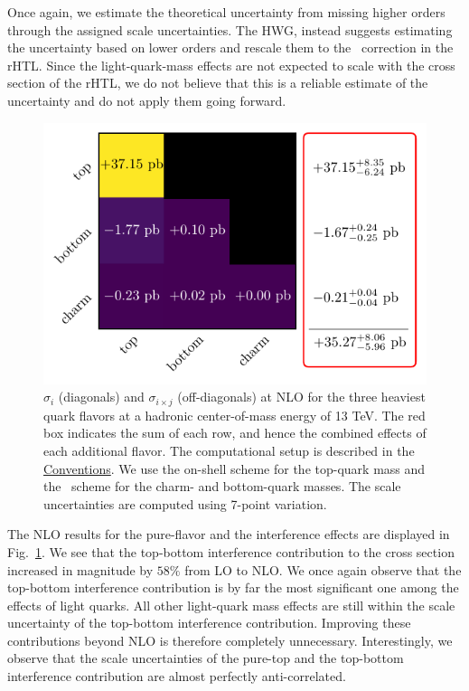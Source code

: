 Once again, we estimate the theoretical uncertainty from missing higher orders through the assigned scale uncertainties. The HWG, instead suggests estimating the uncertainty based on lower orders and rescale them to the \NNNLO\ correction in the \acs{rHTL}. Since the light-quark-mass effects are not expected to scale with the cross section of the \acs{rHTL}, we do not believe that this is a reliable estimate of the uncertainty and do not apply them going forward.

\begin{figure}[ht]
  \centering
  \includegraphics[scale=0.9]{Images/quark_effects_NLO.pdf}
  \caption{$\sigma_{i}$ (diagonals) and $\sigma_{i \times j}$ (off-diagonals) at \acs{NLO} for the three heaviest quark flavors at a hadronic center-of-mass energy of 13 TeV. The red box indicates the sum of each row, and hence the combined effects of each additional flavor. The computational setup is described in the \hyperref[chap:notation_and_conventions]{Conventions}. We use the on-shell scheme for the top-quark mass and the \MS\ scheme for the charm- and bottom-quark masses. The scale uncertainties are computed using 7-point variation.}
  \label{fig:4:quark_effects_NLO}
\end{figure}
The \acs{NLO} results for the pure-flavor and the interference effects are displayed in Fig.~\ref{fig:4:quark_effects_NLO}. We see that the top-bottom interference contribution to the cross section increased in magnitude by $58\%$ from \acs{LO} to \acs{NLO}. We once again observe that the top-bottom interference contribution is by far the most significant one among the effects of light quarks. All other light-quark mass effects are still within the scale uncertainty of the top-bottom interference contribution. Improving these contributions beyond \acs{NLO} is therefore completely unnecessary. Interestingly, we observe that the scale uncertainties of the pure-top and the top-bottom interference contribution are almost perfectly anti-correlated.

